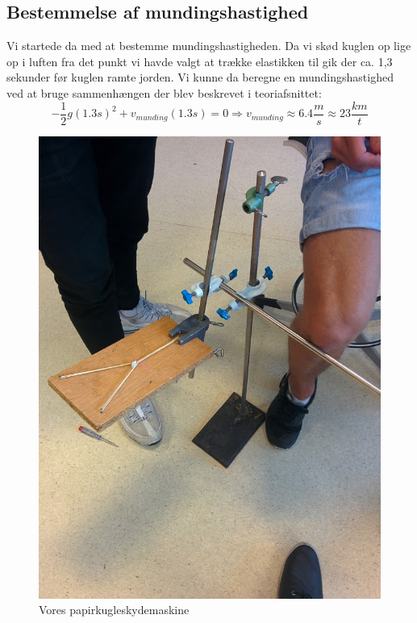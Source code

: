 \documentclass[12pt,a4paper]{article}
\theoremstyle{break}
\theoremstyle{nonumberplain}
\begin{document}
\subsection{Bestemmelse af mundingshastighed}
Vi startede da med at bestemme mundingshastigheden. 
Da vi skød kuglen op lige op i luften fra det punkt vi havde valgt at trække elastikken til gik der ca. 1,3 sekunder før kuglen ramte jorden. 
Vi kunne da beregne en mundingshastighed ved at bruge sammenhængen der blev beskrevet i teoriafsnittet:
$$-\frac{1}{2}g(1.3s)^2 + v_{munding}(1.3 s)=0 \Rightarrow v_{munding}\approx6.4 \frac{m}{s}\approx 23 \frac{km}{t}$$



\begin{figure}
\center
\includegraphics[scale=0.2]{papirkuglekastemaskine}
\caption{Vores papirkugleskydemaskine}\label{maskine}

\end{figure}
\end{document}
